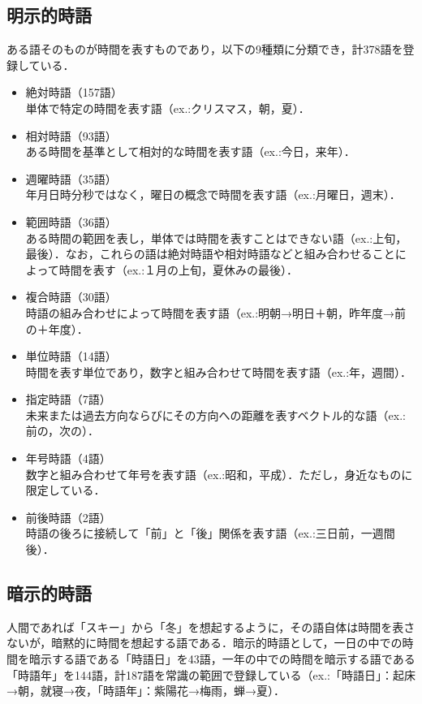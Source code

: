 \subsection{明示的時語}\label{meiji}
ある語そのものが時間を表すものであり，以下の9種類に分類でき，計378語を登録している．
\begin{itemize}
\item 絶対時語（157語）\\
単体で特定の時間を表す語（ex.:クリスマス，朝，夏）．
\item 相対時語（93語）\\
ある時間を基準として相対的な時間を表す語（ex.:今日，来年）．
\item 週曜時語（35語）\\
年月日時分秒ではなく，曜日の概念で時間を表す語（ex.:月曜日，週末）．
\item 範囲時語（36語）\\
ある時間の範囲を表し，単体では時間を表すことはできない語（ex.:上旬，最後）．なお，これらの語は絶対時語や相対時語などと組み合わせることによって時間を表す（ex.:１月の上旬，夏休みの最後）．
\item 複合時語（30語）\\
時語の組み合わせによって時間を表す語（ex.:明朝→明日＋朝，昨年度→前の＋年度）．
\item 単位時語（14語）\\
時間を表す単位であり，数字と組み合わせて時間を表す語（ex.:年，週間）．
\item 指定時語（7語）\\
未来または過去方向ならびにその方向への距離を表すベクトル的な語（ex.:前の，次の）．
\item 年号時語（4語）\\
数字と組み合わせて年号を表す語（ex.:昭和，平成）．ただし，身近なものに限定している．
\item 前後時語（2語）\\
時語の後ろに接続して「前」と「後」関係を表す語（ex.:三日前，一週間後）．
\end{itemize}

\subsection{暗示的時語}\label{anji}
人間であれば「スキー」から「冬」を想起するように，その語自体は時間を表さないが，暗黙的に時間を想起する語である．暗示的時語として，一日の中での時間を暗示する語である「時語日」を43語，一年の中での時間を暗示する語である「時語年」を144語，計187語を常識の範囲で登録している（ex.:「時語日」：起床→朝，就寝→夜，「時語年」：紫陽花→梅雨，蝉→夏）．


